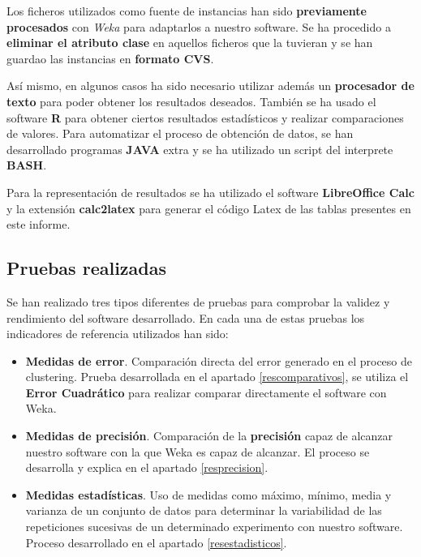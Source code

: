 \documentclass[a4paper]{report}
\begin{document}
	Los ficheros utilizados como fuente de instancias han sido \textbf{previamente procesados} con \textit{Weka} para adaptarlos a nuestro software. Se ha procedido a \textbf{eliminar el atributo clase} en aquellos ficheros que la tuvieran y se han guardao las instancias en \textbf{formato CVS}.
	
	Así mismo, en algunos casos ha sido necesario utilizar además un \textbf{procesador de texto} para poder obtener los resultados deseados. También se ha usado el software \textbf{R} para obtener ciertos resultados estadísticos y realizar comparaciones de valores. Para automatizar el proceso de obtención de datos, se han desarrollado programas \textbf{JAVA} extra y se ha utilizado un script del interprete \textbf{BASH}.
	
	Para la representación de resultados se ha utilizado el software \textbf{LibreOffice Calc} y la extensión \textbf{calc2latex} para generar el código Latex de las tablas presentes en este informe.
	
	\subsection{Pruebas realizadas}
	
	Se han realizado tres tipos diferentes de pruebas para comprobar la validez y rendimiento del software desarrollado. En cada una de estas pruebas los indicadores de referencia utilizados han sido:
	
		\begin{itemize}
			\item	\textbf{Medidas de error}. Comparación directa del error generado en el proceso de clustering. Prueba desarrollada en el apartado \ref{rescomparativos}, se utiliza el \textbf{Error Cuadrático} para realizar comparar directamente el software con Weka.
			
			\item	\textbf{Medidas de precisión}. Comparación de la \textbf{precisión} capaz de alcanzar nuestro software con la que Weka es capaz de alcanzar. El proceso se desarrolla y explica en el apartado \ref{resprecision}.
			
			\item	\textbf{Medidas estadísticas}. Uso de medidas como máximo, mínimo, media y varianza de un conjunto de datos para determinar la variabilidad de las repeticiones sucesivas de un determinado experimento con nuestro software. Proceso desarrollado en el apartado \ref{resestadisticos}.
		\end{itemize}
	
\end{document}
